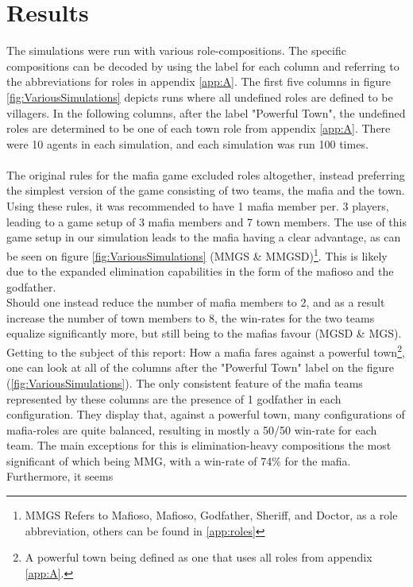 \section{Results}\label{sec:results}
The simulations were run with various 
role-compositions. The specific compositions 
can be decoded by using the label for each 
column and referring to the abbreviations for 
roles in appendix \ref{app:A}. The first five 
columns in figure 
\ref{fig:VariousSimulations} depicts runs 
where all undefined roles are defined to be 
villagers. In the following columns, after 
the label "Powerful Town", the undefined 
roles are determined to be one of each town 
role from appendix \ref{app:A}. There were 10 
agents in each simulation, and each 
simulation was run 100 times.\\\\
The original rules for the mafia game 
excluded roles altogether, instead
preferring the simplest version of the game consisting of two teams, the mafia
and the town. Using these rules\cite{MafiaRules}, it was recommended to have 1
mafia member per. 3 players, leading to a game setup of 3 mafia members and 7
town members. The use of this game setup in our simulation leads to the mafia
having a clear advantage, as can be seen on figure \ref{fig:VariousSimulations}
(MMGS \& MMGSD)\footnote{MMGS Refers to Mafioso, Mafioso, Godfather, Sheriff,
    and Doctor, as a role abbreviation, others can be found in \ref{app:roles}}.
This is likely due to the expanded elimination capabilities in the form of the
mafioso and the godfather. \\ Should one instead reduce the number of mafia
members to 2, and as a result increase the number of town members to 8, the
win-rates for the two teams equalize significantly more, but still being to the
mafias favour (MGSD \& MGS).\\ Getting to the subject of this report: How a
mafia fares against a powerful town\footnote{A powerful town being defined as
    one that uses all roles from appendix \ref{app:A}.}, one can look at all of the
columns after the "Powerful Town" label on the figure
(\ref{fig:VariousSimulations}). The only consistent feature of the mafia teams
represented by these columns are the presence of 1 godfather in each configuration. They
display that, against a powerful town, many configurations of mafia-roles are
quite balanced, resulting in mostly a 50/50 win-rate for each team. The main
exceptions for this is elimination-heavy compositions the most significant of
which being MMG, with a win-rate of 74\% for the mafia. Furthermore, it seems

